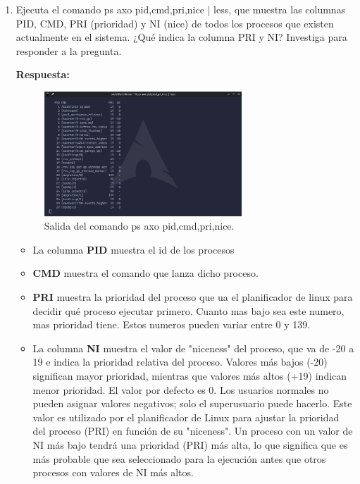 \documentclass[a4paper,12pt]{article}
\begin{document}
\begin{enumerate}[label=\textbf{Pregunta \arabic*.}]
    \newpage
    \item Ejecuta el comando ps axo pid,cmd,pri,nice | less, que muestra las columnas PID,
    CMD, PRI (prioridad) y NI (nice) de todos los procesos que existen actualmente en
    el sistema. ¿Qué indica la columna PRI y NI? Investiga para responder a la pregunta.


    \textbf{Respuesta:}


    \begin{figure}[h!]
        \centering
        \includegraphics[width=0.7\textwidth]{3.png}
        \caption{Salida del comando ps axo pid,cmd,pri,nice.}
    \end{figure}
    \begin{itemize}
         
    
    \item La columna \textbf{PID} muestra el id de los procesos
    \item \textbf{CMD} muestra el comando que lanza dicho proceso.
    \item \textbf{PRI} muestra la prioridad del proceso que ua el planificador de linux para decidir qué proceso ejecutar primero. Cuanto mas bajo sea este numero, mas prioridad tiene. Estos numeros pueden variar entre 0 y 139.
    \item La columna \textbf{NI} muestra el valor de "niceness" del proceso, que va de -20 a 19 e indica la prioridad relativa del proceso. Valores más bajos (-20) significan mayor prioridad, mientras que valores más altos (+19) indican menor prioridad. El valor por defecto es 0. Los usuarios normales no pueden asignar valores negativos; solo el superusuario puede hacerlo. Este valor es utilizado por el planificador de Linux para ajustar la prioridad del proceso (PRI) en función de su "niceness". Un proceso con un valor de NI más bajo tendrá una prioridad (PRI) más alta, lo que significa que es más probable que sea seleccionado para la ejecución antes que otros procesos con valores de NI más altos.
    

\end{itemize}
\end{enumerate}
\end{document}
